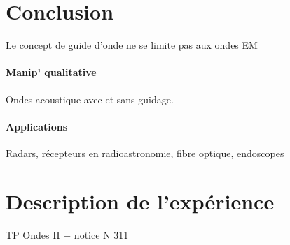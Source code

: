 \documentclass[11pt]{report}
\numberwithin{figure}{section}
\numberwithin{equation}{section}
\numberwithin{table}{section}
\newcommand{\1}{\boldsymbol{1}}
\begin{document}
\section*{Conclusion}
  
\textcolor{mycolor5}{Le concept de guide d'onde ne se limite pas aux ondes EM}

\paragraph*{Manip' qualitative} Ondes acoustique avec et sans guidage.

  
\paragraph*{Applications}  Radars, récepteurs en radioastronomie, fibre optique, endoscopes

\section*{Description de l'expérience}


\textcolor{mycolor5}{TP Ondes II + notice N 311}
\end{document}
